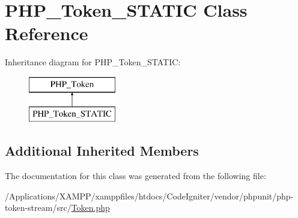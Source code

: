 \hypertarget{class_p_h_p___token___s_t_a_t_i_c}{}\section{P\+H\+P\+\_\+\+Token\+\_\+\+S\+T\+A\+T\+IC Class Reference}
\label{class_p_h_p___token___s_t_a_t_i_c}
Inheritance diagram for P\+H\+P\+\_\+\+Token\+\_\+\+S\+T\+A\+T\+IC\+:\begin{figure}[H]
\begin{center}
\leavevmode
\includegraphics[height=2.000000cm]{class_p_h_p___token___s_t_a_t_i_c}
\end{center}
\end{figure}
\subsection*{Additional Inherited Members}


The documentation for this class was generated from the following file\+:\begin{DoxyCompactItemize}
\item 
/\+Applications/\+X\+A\+M\+P\+P/xamppfiles/htdocs/\+Code\+Igniter/vendor/phpunit/php-\/token-\/stream/src/\mbox{\hyperlink{_token_8php}{Token.\+php}}\end{DoxyCompactItemize}
